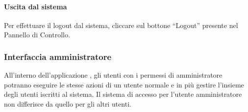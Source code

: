 \paragraph{Uscita dal sistema}
Per effettuare il logout dal sistema, cliccare sul bottone ``Logout'' presente nel Pannello di Controllo.

\subsubsection{Interfaccia amministratore}
All'interno dell'applicazione \progetto, gli utenti con i permessi di amministratore potranno eseguire le stesse azioni di un utente normale e in più gestire l'insieme degli utenti iscritti al sistema. Il sistema di accesso per l'utente amministratore non differisce da quello per gli altri utenti.

